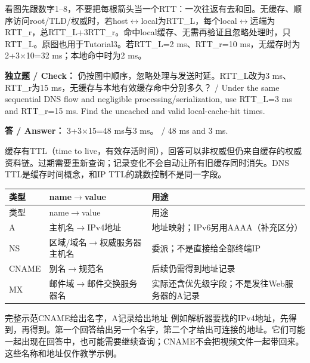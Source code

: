 看图先跟数字1–8，不要把每根箭头当一个RTT：一次往返有去和回。无缓存、顺序访问root/TLD/权威时，若host\ensuremath{\leftrightarrow}local为RTT\_L，每个local\ensuremath{\leftrightarrow}远端为RTT\_r，总RTT\_L+3RTT\_r。命中local缓存、无需再验证且忽略处理时，只RTT\_L。原图也用于Tutorial3。若RTT\_L=2 ms、RTT\_r=10 ms，无缓存时为2+3\ensuremath{\times}10=32 ms；本地命中时为2 ms。


\textbf{独立题 / Check：} 仍按图中顺序，忽略处理与发送时延。RTT\_L改为3 ms、RTT\_r为15 ms，无缓存与本地有效缓存命中分别多久？ / Under the same sequential DNS flow and negligible processing/serialization, use RTT\_L=3 ms and RTT\_r=15 ms. Find the uncached and valid local-cache-hit times.


\textbf{答 / Answer：} 3+3\ensuremath{\times}15=48 ms与3 ms。 / 48 ms and 3 ms.


缓存有TTL（time to live，有效存活时间），回答可以非权威但仍来自缓存的权威资料链。过期需要重新查询；记录变化不会自动让所有旧缓存同时消失。DNS TTL是缓存时间概念，和IP TTL的跳数控制不是同一字段。





\begingroup
\small\setlength{\tabcolsep}{3pt}
\renewcommand{\arraystretch}{1.22}
\begin{longtable}{@{}>{\raggedright\arraybackslash}p{}>{\raggedright\arraybackslash}p{}>{\raggedright\arraybackslash}p{}@{}}
\toprule
类型 & name\ensuremath{\to}value & 用途 \\
\midrule\endfirsthead
类型 & name\ensuremath{\to}value & 用途 \\
\midrule\endhead
\bottomrule\endfoot
A & 主机名\ensuremath{\to}IPv4地址 & 地址映射；IPv6另用AAAA（补充区分） \\
NS & 区域/域名\ensuremath{\to}权威服务器主机名 & 委派；不是直接给全部终端IP \\
CNAME & 别名\ensuremath{\to}规范名 & 后续仍需得到地址记录 \\
MX & 邮件域\ensuremath{\to}邮件交换服务器名 & 实际还含优先级字段；不是发往Web服务器的A记录 \\
\end{longtable}
\endgroup


\begin{StudyBlock}{完整示范}{CNAME给出名字，A记录给出地址}
例如解析器要找的IPv4地址，先得到，再得到。第一个回答给出另一个名字，第二个才给出可连接的地址。它们可能一起出现在回答中，也可能需要继续查询；CNAME不会把视频文件一起带回来。这些名称和地址仅作教学示例。
\end{StudyBlock}


